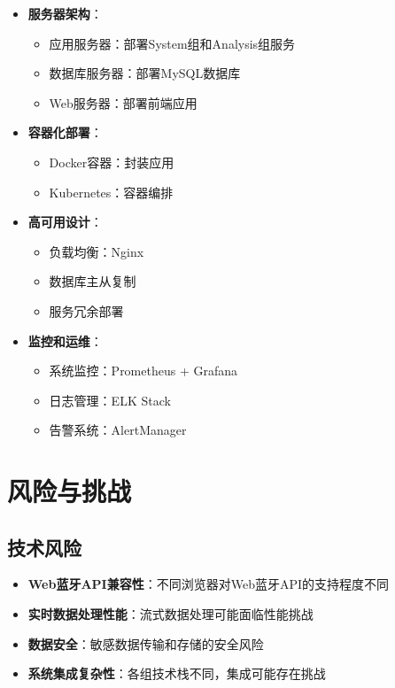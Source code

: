 \documentclass[a4paper,12pt]{article}
\begin{document}
\begin{itemize}
  \item \textbf{服务器架构}：
    \begin{itemize}
      \item 应用服务器：部署System组和Analysis组服务
      \item 数据库服务器：部署MySQL数据库
      \item Web服务器：部署前端应用
    \end{itemize}
  
  \item \textbf{容器化部署}：
    \begin{itemize}
      \item Docker容器：封装应用
      \item Kubernetes：容器编排
    \end{itemize}
  
  \item \textbf{高可用设计}：
    \begin{itemize}
      \item 负载均衡：Nginx
      \item 数据库主从复制
      \item 服务冗余部署
    \end{itemize}
  
  \item \textbf{监控和运维}：
    \begin{itemize}
      \item 系统监控：Prometheus + Grafana
      \item 日志管理：ELK Stack
      \item 告警系统：AlertManager
    \end{itemize}
\end{itemize}

\section{风险与挑战}

\subsection{技术风险}

\begin{itemize}
  \item \textbf{Web蓝牙API兼容性}：不同浏览器对Web蓝牙API的支持程度不同
  \item \textbf{实时数据处理性能}：流式数据处理可能面临性能挑战
  \item \textbf{数据安全}：敏感数据传输和存储的安全风险
  \item \textbf{系统集成复杂性}：各组技术栈不同，集成可能存在挑战
\end{itemize}
\end{document}
